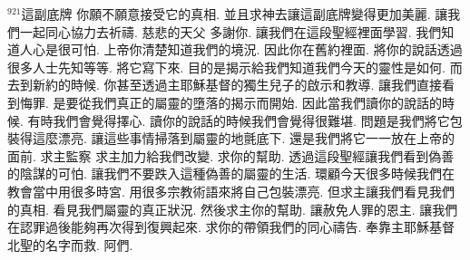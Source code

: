 \documentclass{book}
\begin{document}
$^{921}$這副底牌 你願不願意接受它的真相.
並且求神去讓這副底牌變得更加美麗.
讓我們一起同心協力去祈禱.
慈悲的天父 多謝你.
讓我們在這段聖經裡面學習.
我們知道人心是很可怕.
上帝你清楚知道我們的境況.
因此你在舊約裡面.
將你的說話透過很多人士先知等等.
將它寫下來.
目的是揭示給我們知道我們今天的靈性是如何.
而去到新約的時候.
你甚至透過主耶穌基督的獨生兒子的啟示和教導.
讓我們直接看到悔罪.
是要從我們真正的屬靈的墮落的揭示而開始.
因此當我們讀你的說話的時候.
有時我們會覺得擇心.
讀你的說話的時候我們會覺得很難堪.
問題是我們將它包裝得這麼漂亮.
讓這些事情掃落到屬靈的地氈底下.
還是我們將它一一放在上帝的面前.
求主監察 求主加力給我們改變.
求你的幫助.
透過這段聖經讓我們看到偽善的陰謀的可怕.
讓我們不要跌入這種偽善的屬靈的生活.
環顧今天很多時候我們在教會當中用很多時宮.
用很多宗教術語來將自己包裝漂亮.
但求主讓我們看見我們的真相.
看見我們屬靈的真正狀況.
然後求主你的幫助.
讓赦免人罪的恩主.
讓我們在認罪過後能夠再次得到復興起來.
求你的帶領我們的同心禱告.
奉靠主耶穌基督 北聖的名字而救.
阿們.
\newpage
\end{document}
